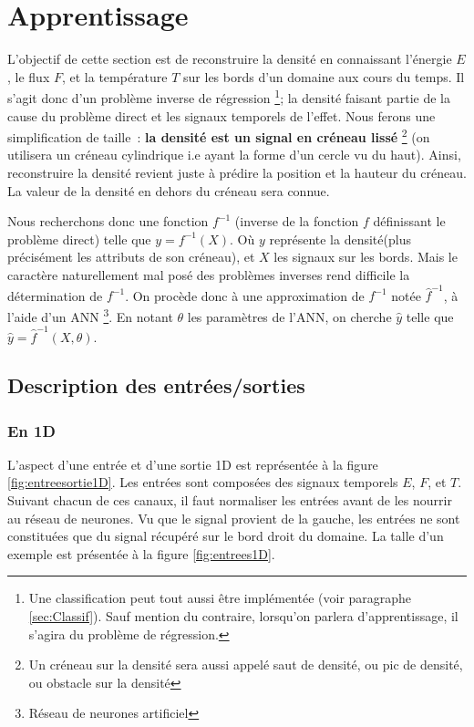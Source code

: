 
\chapter{Apprentissage} %

\label{Chapter4} %

L'objectif de cette section est de reconstruire la densité en connaissant l'énergie $E$, le flux $F$, et la température $T$ sur les bords d'un domaine aux cours du temps. Il s'agit donc d'un problème inverse de régression \footnote{Une classification peut tout aussi être implémentée (voir paragraphe \ref{sec:Classif}). Sauf mention du contraire, lorsqu'on parlera d'apprentissage, il s'agira du problème de régression.}; la densité faisant partie de la cause du problème direct et les signaux temporels de l'effet. Nous ferons une simplification de taille : \textbf{la densité est un signal en créneau lissé} \footnote{Un créneau sur la densité sera aussi appelé saut de densité, ou pic de densité, ou obstacle sur la densité} (on utilisera un créneau cylindrique i.e ayant la forme d'un cercle vu du haut). Ainsi, reconstruire la densité revient juste à prédire la position et la hauteur du créneau. La valeur de la densité en dehors du créneau sera connue. 

Nous recherchons donc une fonction $f^{-1}$ (inverse de la fonction $f$ définissant le problème direct) telle que $y = f^{-1}(X)$. Où $y$ représente la densité(plus précisément les attributs de son créneau), et $X$ les signaux sur les bords. Mais le caractère naturellement mal posé des problèmes inverses rend difficile la détermination de $f^{-1}$. On procède donc à une approximation de $f^{-1}$ notée $\hat{f}^{-1}$, à l'aide d'un ANN \footnote{Réseau de neurones artificiel}. En notant $\theta$ les paramètres de l'ANN, on cherche $\hat{y}$ telle que $ \hat{y} = \hat{f}^{-1}(X, \theta). $


\section{Description des entrées/sorties}

\subsection{En 1D}
L'aspect d'une entrée et d'une sortie 1D est représentée à la figure \ref{fig:entreesortie1D}. Les entrées sont composées des signaux temporels $E$, $F$, et $T$. Suivant chacun de ces canaux, il faut normaliser les entrées avant de les nourrir au réseau de neurones. Vu que le signal provient de la gauche, les entrées ne sont constituées que du signal récupéré sur le bord droit du domaine. La talle d'un exemple est présentée à la figure \ref{fig:entrees1D}. 

